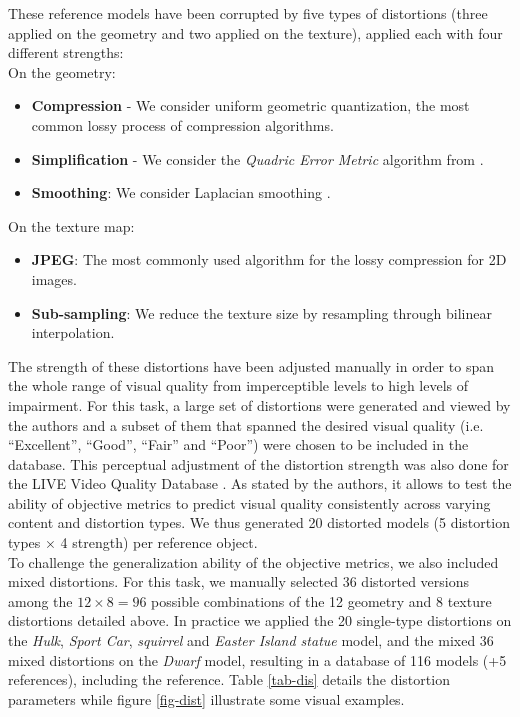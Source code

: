 These reference models have been corrupted by five types of distortions (three applied on the geometry and two applied on the texture), applied each with four different strengths:\\
On the geometry:
\begin{itemize}
\item \textbf{Compression} - We consider uniform geometric quantization, the most common lossy process of compression algorithms.
\item  \textbf{Simplification} - We consider the \textit{Quadric Error Metric} algorithm from \citet{GARLAND-1997}.
\item \textbf{Smoothing}: We consider Laplacian smoothing \cite{Taubin:1995}.
\end{itemize}
On the texture map:
\begin{itemize}
\item \textbf{JPEG}: The most commonly used algorithm for the lossy compression for 2D images.
\item \textbf{Sub-sampling}: We reduce the texture size by resampling through bilinear interpolation.
\end{itemize}
The strength of these distortions have been adjusted manually in order to span the whole range of visual quality from imperceptible levels to high levels of impairment. For this task, a large set of distortions were generated and viewed by the authors and a subset of them that spanned the desired visual quality (i.e. “Excellent”, “Good”, “Fair” and “Poor”) were chosen to be included in the database. This perceptual adjustment of the distortion strength was also done for the LIVE Video Quality Database \cite{Seshadrinathan2010}. As stated by the authors, it allows to test the ability of objective metrics to predict visual quality consistently across varying content and distortion types. We thus generated 20 distorted models (5 distortion types $\times$ 4 strength) per reference object. \\
To challenge the generalization ability of the objective metrics, we also included mixed distortions. For this task, we manually selected 36 distorted versions among the $12\times8=96$ possible combinations of the 12 geometry and 8 texture distortions detailed above. In practice we applied the 20 single-type distortions on the \textit{Hulk}, \textit{Sport Car}, \textit{squirrel} and \textit{Easter Island statue} model, and the mixed 36 mixed distortions on the \textit{Dwarf} model, resulting in a database of 116 models (+5 references), including the reference. Table \ref{tab-dis} details the distortion parameters while figure \ref{fig-dist} illustrate some visual examples.\\
